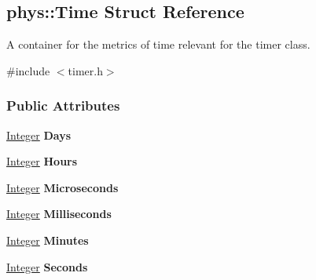 \hypertarget{structphys_1_1Time}{
\subsection{phys::Time Struct Reference}
\label{structphys_1_1Time}
}


A container for the metrics of time relevant for the timer class.  




{\ttfamily \#include $<$timer.h$>$}

\subsubsection*{Public Attributes}
\begin{DoxyCompactItemize}
\item 
\hypertarget{structphys_1_1Time_aab43bd475fab9342887b0762281e80a4}{
\hyperlink{namespacephys_a7f09bf5585b2bb97613cd9aad4273a81}{Integer} {\bfseries Days}}
\label{structphys_1_1Time_aab43bd475fab9342887b0762281e80a4}

\item 
\hypertarget{structphys_1_1Time_aceeebc7a8950d38fb9c9bcf483a5a751}{
\hyperlink{namespacephys_a7f09bf5585b2bb97613cd9aad4273a81}{Integer} {\bfseries Hours}}
\label{structphys_1_1Time_aceeebc7a8950d38fb9c9bcf483a5a751}

\item 
\hypertarget{structphys_1_1Time_ad0e070fdec0d826d73dc01f5ee4dddc7}{
\hyperlink{namespacephys_a7f09bf5585b2bb97613cd9aad4273a81}{Integer} {\bfseries Microseconds}}
\label{structphys_1_1Time_ad0e070fdec0d826d73dc01f5ee4dddc7}

\item 
\hypertarget{structphys_1_1Time_afeb0b8025b7cea824a84523565d7dd60}{
\hyperlink{namespacephys_a7f09bf5585b2bb97613cd9aad4273a81}{Integer} {\bfseries Milliseconds}}
\label{structphys_1_1Time_afeb0b8025b7cea824a84523565d7dd60}

\item 
\hypertarget{structphys_1_1Time_a142f48583baee67495ea65acf76cbdd5}{
\hyperlink{namespacephys_a7f09bf5585b2bb97613cd9aad4273a81}{Integer} {\bfseries Minutes}}
\label{structphys_1_1Time_a142f48583baee67495ea65acf76cbdd5}

\item 
\hypertarget{structphys_1_1Time_aa526d7de0d2fde457dc458d7ee6285d1}{
\hyperlink{namespacephys_a7f09bf5585b2bb97613cd9aad4273a81}{Integer} {\bfseries Seconds}}
\label{structphys_1_1Time_aa526d7de0d2fde457dc458d7ee6285d1}

\end{DoxyCompactItemize}


